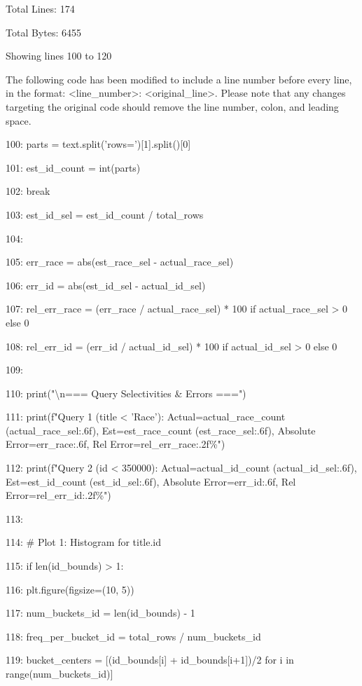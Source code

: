 \documentclass[11pt,a4paper]{article}
\begin{document}
Total Lines: 174

Total Bytes: 6455

Showing lines 100 to 120

The following code has been modified to include a line number before every line, in the format: <line\_number>: <original\_line>. Please note that any changes targeting the original code should remove the line number, colon, and leading space.

100:             parts = text.split('rows=')[1].split()[0]

101:             est\_id\_count = int(parts)

102:             break

103:     est\_id\_sel = est\_id\_count / total\_rows

104:

105:     err\_race = abs(est\_race\_sel - actual\_race\_sel)

106:     err\_id = abs(est\_id\_sel - actual\_id\_sel)

107:     rel\_err\_race = (err\_race / actual\_race\_sel) * 100 if actual\_race\_sel > 0 else 0

108:     rel\_err\_id = (err\_id / actual\_id\_sel) * 100 if actual\_id\_sel > 0 else 0

109:

110:     print("\textbackslash{}n=== Query Selectivities \& Errors ===")

111:     print(f"Query 1 (title < 'Race'): Actual={actual\_race\_count} ({actual\_race\_sel:.6f}), Est={est\_race\_count} ({est\_race\_sel:.6f}), Absolute Error={err\_race:.6f}, Rel Error={rel\_err\_race:.2f}\%")

112:     print(f"Query 2 (id < 350000): Actual={actual\_id\_count} ({actual\_id\_sel:.6f}), Est={est\_id\_count} ({est\_id\_sel:.6f}), Absolute Error={err\_id:.6f}, Rel Error={rel\_err\_id:.2f}\%")

113:

114:     \# Plot 1: Histogram for title.id

115:     if len(id\_bounds) > 1:

116:         plt.figure(figsize=(10, 5))

117:         num\_buckets\_id = len(id\_bounds) - 1

118:         freq\_per\_bucket\_id = total\_rows / num\_buckets\_id

119:         bucket\_centers = [(id\_bounds[i] + id\_bounds[i+1])/2 for i in range(num\_buckets\_id)]
\end{document}
